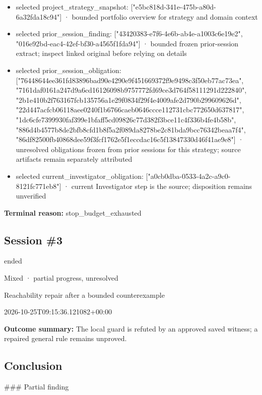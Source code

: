\documentclass[11pt]{article}
\begin{document}
\begin{itemize}
\item selected project\_strategy\_snapshot: ["e5bc818d-341e-475b-a80d-6a32fda18c94"] · bounded portfolio overview for strategy and domain context
\item selected prior\_session\_finding: ["43420383-e7f6-4e6b-ab4e-a1003c6e19e2", "016e92bd-eac4-42ef-bf30-a4565f1fda94"] · bounded frozen prior-session extract; inspect linked original before relying on details
\item selected prior\_session\_obligation: ["76448644ee361fd83896bad90e4290e9f451669372f9e9498c3f50eb77ac73ea", "7161daf0161a247d9a6cd16126098b9757772fd69ce3d764f58111291d222840", "2b1e410b2f763167fcb135756a1e29f0834f29f4e4009afe2d790b299609626d", "22d447acfcb06118aee0240f1b6766caeb0646ccce112731cbc772650d637817", "1dc6cfe7399930faf399e1bfaff5cd09826c77d382f3bce11c4f336b4fe4b58b", "886d4b4577b8de2bfb8cfd1b8f5a2f089da8278be2c81bda9bcc76342beaa7f4", "86df82500fb40868dee59f3fcf1762e5f1eccdac16c5f13847330d46f41ae9e8"] · unresolved obligations frozen from prior sessions for this strategy; source artifacts remain separately attributed
\item selected current\_investigator\_obligation: ["a0cb0dba-0533-4a2c-a9c0-8121fc771eb8"] · current Investigator step is the source; disposition remains unverified
\end{itemize}
\textbf{Terminal reason:} stop\_budget\_exhausted\par
\subsection{Session \#3}
\begin{description}[style=nextline,font=\normalfont\bfseries,leftmargin=0pt,labelsep=0pt]
\item[Execution status] ended
\item[Outcome] Mixed · partial progress, unresolved
\item[Strategy] Reachability repair after a bounded counterexample
\item[Started] 2026-10-25T09:15:36.121082+00:00
\end{description}
\textbf{Outcome summary:} The local guard is refuted by an approved saved witness; a repaired general rule remains unproved.\par
\subsection{Conclusion}
\#\#\# Partial finding
\end{document}
